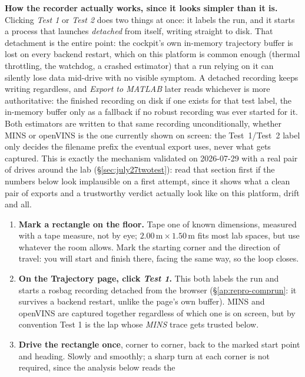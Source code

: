 \begin{enumerate}[leftmargin=1.4em]
  \textbf{How the recorder actually works, since it looks simpler than it
  is.} Clicking \emph{Test 1} or \emph{Test 2} does two things at once: it
  labels the run, and it starts a  process that
   launches \emph{detached} from itself, writing
  straight to disk. That detachment is the entire point: the cockpit's own
  in-memory trajectory buffer is lost on every backend restart, which on
  this platform is common enough (thermal throttling, the watchdog, a
  crashed estimator) that a run relying on it can silently lose data
  mid-drive with no visible symptom. A detached recording keeps writing
  regardless, and \emph{Export to MATLAB} later reads whichever is more
  authoritative: the finished recording on disk if one exists for that test
  label, the in-memory buffer only as a fallback if no robust recording was
  ever started for it. Both estimators are written to that same recording
  unconditionally, whether MINS or openVINS is the one currently shown on
  screen: the Test~1/Test~2 label only decides the filename prefix the
  eventual export uses, never what gets captured. This is exactly the
  mechanism validated on 2026-07-29 with a real pair of drives around the
  lab (\S\ref{sec:july27twotest}): read that section first if the numbers
  below look implausible on a first attempt, since it shows what a clean
  pair of exports and a trustworthy verdict actually look like on this
  platform, drift and all.
\begin{enumerate}[leftmargin=1.2em]
\item \textbf{Mark a rectangle on the floor.} Tape one of known dimensions,
  measured with a tape measure, not by eye; $2.00\,\text{m} \times
  1.50\,\text{m}$ fits most lab spaces, but use whatever the room allows.
  Mark the starting corner and the direction of travel: you will start and
  finish there, facing the same way, so the loop closes.
\item \textbf{On the Trajectory page, click \emph{Test 1}.} This both
  labels the run and starts a rosbag recording detached from the browser
  (\S\ref{ap:repro-comprun}: it survives a backend restart, unlike the
  page's own buffer). MINS and openVINS are captured together regardless
  of which one is on screen, but by convention Test 1 is the lap whose
  \emph{MINS} trace gets trusted below.
\item \textbf{Drive the rectangle once}, corner to corner, back to the
  marked start point and heading. Slowly and smoothly; a sharp turn at
  each corner is not required, since the analysis below reads the

\end{enumerate}
\end{enumerate}
